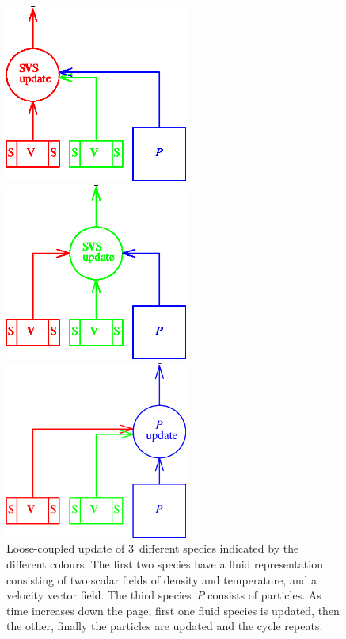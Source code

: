 \begin{figure}
\centerline{\includegraphics[width=6cm]{../pics/fvms}}
\centerline{\includegraphics[width=6cm]{../pics/fvps}}
\centerline{\includegraphics[width=6cm]{../pics/pups}}
\caption{Loose-coupled update of $3$~different species indicated by the different colours.
The first two species have a fluid representation consisting of two scalar fields
of density and temperature, and a velocity vector field. The third species~$P$
consists of particles.  As time increases down the page, first one fluid species
is updated, then the other, finally the particles are updated and the cycle repeats.
\label{fig:loose}}
\end{figure}

